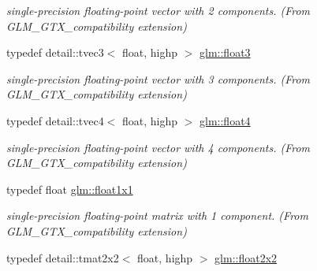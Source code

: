 \begin{CompactItemize}
\begin{CompactList}\small\item\em single-precision floating-point vector with 2 components. (From GLM\_\-GTX\_\-compatibility extension) \item\end{CompactList}\item 
\hypertarget{group__gtx__compatibility_g7e0d8fa3501c0a7eaaca31adb6e02de2}{
typedef detail::tvec3$<$ float, highp $>$ \hyperlink{group__gtx__compatibility_g7e0d8fa3501c0a7eaaca31adb6e02de2}{glm::float3}}
\label{group__gtx__compatibility_g7e0d8fa3501c0a7eaaca31adb6e02de2}

\begin{CompactList}\small\item\em single-precision floating-point vector with 3 components. (From GLM\_\-GTX\_\-compatibility extension) \item\end{CompactList}\item 
\hypertarget{group__gtx__compatibility_gc0676d140051809309ca683c325bf439}{
typedef detail::tvec4$<$ float, highp $>$ \hyperlink{group__gtx__compatibility_gc0676d140051809309ca683c325bf439}{glm::float4}}
\label{group__gtx__compatibility_gc0676d140051809309ca683c325bf439}

\begin{CompactList}\small\item\em single-precision floating-point vector with 4 components. (From GLM\_\-GTX\_\-compatibility extension) \item\end{CompactList}\item 
\hypertarget{group__gtx__compatibility_gac1faa940ac1fbb32d4a315005b578af}{
typedef float \hyperlink{group__gtx__compatibility_gac1faa940ac1fbb32d4a315005b578af}{glm::float1x1}}
\label{group__gtx__compatibility_gac1faa940ac1fbb32d4a315005b578af}

\begin{CompactList}\small\item\em single-precision floating-point matrix with 1 component. (From GLM\_\-GTX\_\-compatibility extension) \item\end{CompactList}\item 
\hypertarget{group__gtx__compatibility_ga4a1e4449913b2437f12434ed713dd73}{
typedef detail::tmat2x2$<$ float, highp $>$ \hyperlink{group__gtx__compatibility_ga4a1e4449913b2437f12434ed713dd73}{glm::float2x2}}
\label{group__gtx__compatibility_ga4a1e4449913b2437f12434ed713dd73}


\end{CompactItemize}
